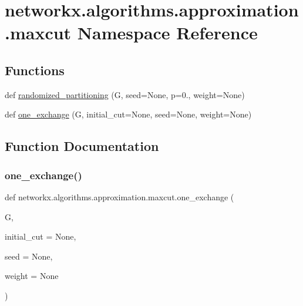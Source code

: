 \hypertarget{namespacenetworkx_1_1algorithms_1_1approximation_1_1maxcut}{}\section{networkx.\+algorithms.\+approximation.\+maxcut Namespace Reference}
\label{namespacenetworkx_1_1algorithms_1_1approximation_1_1maxcut}
\subsection*{Functions}
\begin{DoxyCompactItemize}
\item 
def \hyperlink{namespacenetworkx_1_1algorithms_1_1approximation_1_1maxcut_aba14cb3f2eb41bb77918b1e5a3473ecb}{randomized\+\_\+partitioning} (G, seed=None, p=0., weight=None)
\item 
def \hyperlink{namespacenetworkx_1_1algorithms_1_1approximation_1_1maxcut_ab31fcbeda98de38321d18b6b8aadd120}{one\+\_\+exchange} (G, initial\+\_\+cut=None, seed=None, weight=None)
\end{DoxyCompactItemize}


\subsection{Function Documentation}
\mbox{\label{namespacenetworkx_1_1algorithms_1_1approximation_1_1maxcut_ab31fcbeda98de38321d18b6b8aadd120}} 
\subsubsection{\texorpdfstring{one\+\_\+exchange()}{one\_exchange()}}
{\footnotesize\ttfamily def networkx.\+algorithms.\+approximation.\+maxcut.\+one\+\_\+exchange (\begin{DoxyParamCaption}\item[{}]{G,  }\item[{}]{initial\+\_\+cut = {\ttfamily None},  }\item[{}]{seed = {\ttfamily None},  }\item[{}]{weight = {\ttfamily None} }\end{DoxyParamCaption})}


